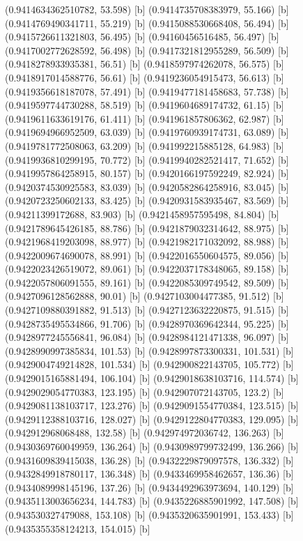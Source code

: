 {{{(0.9414634362510782, 53.598) [b] 
(0.9414735708383979, 55.166) [b] 
(0.9414769490341711, 55.219) [b] 
(0.9415088530668408, 56.494) [b] 
(0.9415726611321803, 56.495) [b] 
(0.94160456516485, 56.497) [b] 
(0.9417002772628592, 56.498) [b] 
(0.9417321812955289, 56.509) [b] 
(0.9418278933935381, 56.51) [b] 
(0.9418597974262078, 56.575) [b] 
(0.9418917014588776, 56.61) [b] 
(0.9419236054915473, 56.613) [b] 
(0.9419356618187078, 57.491) [b] 
(0.9419477181458683, 57.738) [b] 
(0.9419597744730288, 58.519) [b] 
(0.9419604689174732, 61.15) [b] 
(0.9419611633619176, 61.411) [b] 
(0.941961857806362, 62.987) [b] 
(0.9419694966952509, 63.039) [b] 
(0.9419760939174731, 63.089) [b] 
(0.9419781772508063, 63.209) [b] 
(0.941992215885128, 64.983) [b] 
(0.9419936810299195, 70.772) [b] 
(0.9419940282521417, 71.652) [b] 
(0.9419957864258915, 80.157) [b] 
(0.9420166197592249, 82.924) [b] 
(0.9420374530925583, 83.039) [b] 
(0.9420582864258916, 83.045) [b] 
(0.9420723250602133, 83.425) [b] 
(0.9420931583935467, 83.569) [b] 
(0.94211399172688, 83.903) [b] 
(0.9421458957595498, 84.804) [b] 
(0.9421789645426185, 88.786) [b] 
(0.9421879032314642, 88.975) [b] 
(0.9421968419203098, 88.977) [b] 
(0.9421982171032092, 88.988) [b] 
(0.9422009674690078, 88.991) [b] 
(0.9422016550604575, 89.056) [b] 
(0.9422023426519072, 89.061) [b] 
(0.9422037178348065, 89.158) [b] 
(0.9422057806091555, 89.161) [b] 
(0.9422085309749542, 89.509) [b] 
(0.9427096128562888, 90.01) [b] 
(0.9427103004477385, 91.512) [b] 
(0.9427109880391882, 91.513) [b] 
(0.9427123632220875, 91.515) [b] 
(0.9428735495534866, 91.706) [b] 
(0.9428970369642344, 95.225) [b] 
(0.9428977245556841, 96.084) [b] 
(0.9428984121471338, 96.097) [b] 
(0.9428990997385834, 101.53) [b] 
(0.9428997873300331, 101.531) [b] 
(0.9429004749214828, 101.534) [b] 
(0.942900822143705, 105.772) [b] 
(0.9429015165881494, 106.104) [b] 
(0.9429018638103716, 114.574) [b] 
(0.9429029054770383, 123.195) [b] 
(0.942907072143705, 123.2) [b] 
(0.9429081138103717, 123.276) [b] 
(0.9429091554770384, 123.515) [b] 
(0.9429112388103716, 128.027) [b] 
(0.9429122804770383, 129.095) [b] 
(0.942912968068488, 132.58) [b] 
(0.942974972036742, 136.263) [b] 
(0.9430369760049959, 136.264) [b] 
(0.9430989799732499, 136.266) [b] 
(0.9431609839415038, 136.28) [b] 
(0.9432229879097578, 136.332) [b] 
(0.9432849918780117, 136.348) [b] 
(0.9433469958462657, 136.36) [b] 
(0.9434089998145196, 137.26) [b] 
(0.9434492963973694, 140.129) [b] 
(0.9435113003656234, 144.783) [b] 
(0.9435226885901992, 147.508) [b] 
(0.943530327479088, 153.108) [b] 
(0.9435320635901991, 153.433) [b] 
(0.9435355358124213, 154.015) [b] 
}}}
